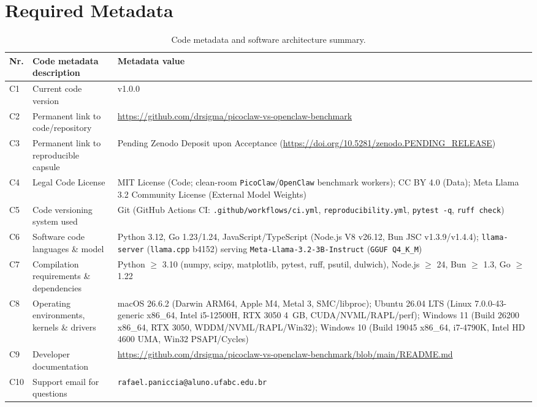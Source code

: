 \documentclass[preprint,12pt,3p]{elsarticle}
\begin{document}
\section*{Required Metadata}
\label{sec:metadata}

\begin{table}[h!]
\small
\centering
\begin{tabular}{|l|p{6.5cm}|p{6.5cm}|}
\hline
\textbf{Nr.} & \textbf{Code metadata description} & \textbf{Metadata value} \\
\hline
C1 & Current code version & v1.0.0 \\
\hline
C2 & Permanent link to code/repository & \url{https://github.com/drsigma/picoclaw-vs-openclaw-benchmark} \\
\hline
C3 & Permanent link to reproducible capsule & Pending Zenodo Deposit upon Acceptance (\url{https://doi.org/10.5281/zenodo.PENDING_RELEASE}) \\
\hline
C4 & Legal Code License & MIT License (Code; clean-room \texttt{PicoClaw}/\texttt{OpenClaw} benchmark workers); CC BY 4.0 (Data); Meta Llama 3.2 Community License (External Model Weights) \\
\hline
C5 & Code versioning system used & Git (GitHub Actions CI: \texttt{.github/workflows/ci.yml}, \texttt{reproducibility.yml}, \texttt{pytest -q}, \texttt{ruff check}) \\
\hline
C6 & Software code languages \& model & Python 3.12, Go 1.23/1.24, JavaScript/TypeScript (Node.js V8 v26.12, Bun JSC v1.3.9/v1.4.4); \texttt{llama-server} (\texttt{llama.cpp} b4152) serving \texttt{Meta-Llama-3.2-3B-Instruct} (\texttt{GGUF Q4\_K\_M}) \\
\hline
C7 & Compilation requirements \& dependencies & Python $\ge$ 3.10 (numpy, scipy, matplotlib, pytest, ruff, psutil, dulwich), Node.js $\ge$ 24, Bun $\ge$ 1.3, Go $\ge$ 1.22 \\
\hline
C8 & Operating environments, kernels \& drivers & macOS 26.6.2 (Darwin ARM64, Apple M4, Metal 3, SMC/libproc); Ubuntu 26.04 LTS (Linux 7.0.0-43-generic x86\_64, Intel i5-12500H, RTX 3050 4~GB, CUDA/NVML/RAPL/perf); Windows 11 (Build 26200 x86\_64, RTX 3050, WDDM/NVML/RAPL/Win32); Windows 10 (Build 19045 x86\_64, i7-4790K, Intel HD 4600 UMA, Win32 PSAPI/Cycles) \\
\hline
C9 & Developer documentation & \url{https://github.com/drsigma/picoclaw-vs-openclaw-benchmark/blob/main/README.md} \\
\hline
C10 & Support email for questions & \texttt{rafael.paniccia@aluno.ufabc.edu.br} \\
\hline
\end{tabular}
\caption{Code metadata and software architecture summary.}
\label{tab:code_metadata}
\end{table}
\end{document}
